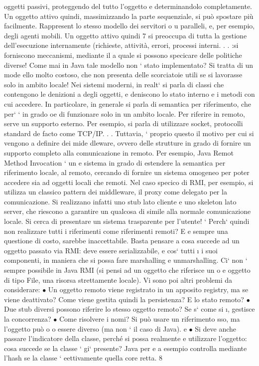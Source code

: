 \documentclass[a4paper,12pt]{article}
\begin{document}
oggetti passivi, proteggendo del tutto l'oggetto e determinandolo completamente. Un oggetto attivo quindi, massimizzando
la parte sequenziale,
si può spostare più facilmente. Rappresent lo stesso modello dei servitori
o
u
paralleli, e, per esempio, degli agenti mobili. Un oggetto attivo quindi
7
si preoccupa di tutta la gestione dell'esecuzione internamente (richieste,
attività, errori, processi interni. . . :si forniscono meccanismi, mediante il
a
quale si possono specicare delle politiche diverse!
Come mai in Java tale modello non ` stato implementato? Si tratta di un mode
ello molto costoso, che non presenta delle scorciatoie utili se si lavorasse solo in
ambito locale!
Nei sistemi moderni, in realt` si parla di classi che contengono le denizioni
a
degli oggetti, e deniscono lo stato interno e i metodi con cui accedere. In particolare, in generale si parla di
semantica per riferimento, che per` ` in grado
oe
di funzionare solo in un ambito locale. Per riferire in remoto, serve un supporto
esterno. Per esempio, si parla di utilizzare socket, protocolli standard de facto
come TCP/IP. . .
Tuttavia, ` proprio questo il motivo per cui si vengono a definire dei mide
dleware, ovvero delle strutture in grado di fornire un supporto completo alla
comunicazione in remoto. Per esempio, Java Remot Method Invocation ` un
e
sistema in grado di estendere la semantica per riferimento locale, al remoto,
cercando di fornire un sistema omogeneo per poter accedere sia ad oggetti locali
che remoti. Nel caso specico di RMI, per esempio, si utilizza un classico pattern dei middleware, il proxy come delegato
per la comunicazione. Si realizzano
infatti uno stub lato cliente e uno skeleton lato server, che riescono a garantire
un qualcosa di simile alla normale comunicazione locale. Si cerca di presentare
un sistema trasparente per l'utente!
`
Perch` quindi non realizzare tutti i riferimenti come riferimenti remoti? E
e
sempre una questione di costo, sarebbe inaccettabile. Basta pensare a cosa
succede ad un oggetto passato via RMI: deve essere serializzabile, e cos` tutti
\i{}
i suoi componenti, in maniera che si possa fare marshalling e unmarshalling.
Ci` non ` sempre possibile in Java RMI (si pensi ad un oggetto che riferisce un
o
e
oggetto di tipo File, una risorsa strettamente locale). Vi sono poi altri problemi
da considerare:
$\bullet$ Un oggetto remoto viene registrato in un apposito registry, ma se viene
deattivato? Come viene gestita quindi la persistenza? E lo stato remoto?
$\bullet$ Due stub diversi possono riferire lo stesso oggetto remoto? Se s` come si
\i{},
gestisce la concorrenza?
$\bullet$ Come risolvere i nomi? Si può usare un riferimento sso, ma l'oggetto può
o
o
essere diverso (ma non ` il caso di Java).
e
$\bullet$ Si deve anche passare l'indicatore della classe, perché si possa realmente
e
utilizzare l'oggetto: cosa succede se la classe ` gi` presente? Java per
e a
esempio controlla mediante l'hash se la classe ` eettivamente quella core
retta.
8
\end{document}
